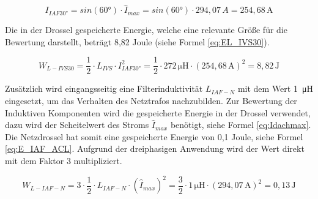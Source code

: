 		
		
		\begin{equation}
			\label{eq:IAF_I30}
			I_{IAF30°}= sin(60°)\cdot \hat{I}_{max}=sin(60°)\cdot 294,07 \,A =254,68\, \si{\A}
		\end{equation}
		
		
		Die in der Drossel gespeicherte Energie, welche eine relevante Größe für die Bewertung darstellt, beträgt 8,82 Joule (siehe Formel \ref{eq:EL_IVS30}).
		
		\begin{equation}
			\label{eq:EL_IVS30}
			W_{L-IVS30}=\dfrac{1}{2} \cdot L_{IVS} \cdot I_{IAF30°}^{2} = \dfrac{1}{2}\cdot 272\, \si{\micro \henry} \cdot (254,68\, \si{\A})^{2} =  8,82 \, \si{\joule}
		\end{equation}
		
		
		
		Zusätzlich wird eingangsseitig eine Filterinduktivität $L_{IAF-N}$ mit dem Wert 1~\si{\micro \henry} eingesetzt, um das Verhalten des Netztrafos nachzubilden. Zur Bewertung der Induktiven Komponenten wird die gespeicherte Energie in der Drossel verwendet, dazu wird der Scheitelwert des Stroms $\hat{I}_{max}$ benötigt, siehe Formel \ref{eq:Idachmax}. Die Netzdrossel hat somit eine gespeicherte Energie von 0,1 Joule, siehe Formel \ref{eq:E_IAF_ACL}. Aufgrund der dreiphasigen Anwendung wird der Wert direkt mit dem Faktor 3 multipliziert.
			
			\begin{equation}
			\label{eq:E_IAF_ACL}
			W_{L-IAF-N}= 3\cdot \dfrac{1}{2} \cdot L_{IAF-N} \cdot (\hat{I}_{max})^2=\dfrac{3}{2} \cdot 1\, \si{\micro \henry} \cdot (294,07 \, \si{\ampere})^{2} = 0,13 \, \si{\joule}
		\end{equation}
	
